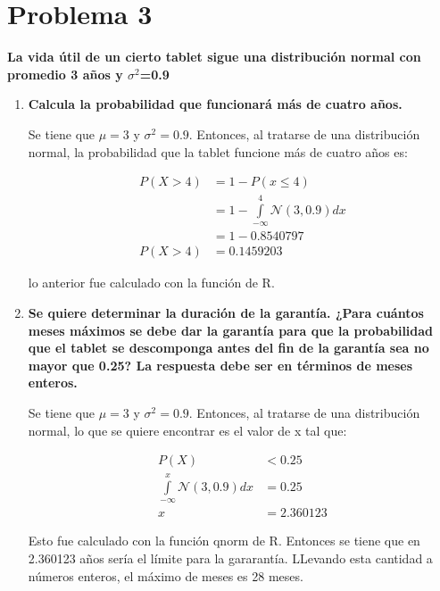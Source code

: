 \section*{Problema 3}
\textbf{La vida útil de un cierto tablet sigue una distribución normal con promedio 3 años y $\sigma^2$=0.9}

\begin{enumerate}
    \item \textbf{Calcula la probabilidad que funcionará más de cuatro años.}

          Se tiene que $\mu=3$ y $\sigma^2=0.9$. Entonces, al tratarse de una distribución normal, la probabilidad que la tablet funcione más de cuatro años es:

          \begin{align*}
              P(X>4) & = 1 - P(x\leq 4)                                    \\
                     & = 1 - \int\limits_{-\infty}^4 \mathcal{N} (3,0.9)dx \\
                     & = 1 - 0.8540797                                     \\
              P(X>4) & = 0.1459203
          \end{align*}

          lo anterior fue calculado con la función  de R.

    \item \textbf{Se quiere determinar la duración de la garantía. ¿Para cuántos meses máximos se debe dar la garantía para que la probabilidad que el tablet se descomponga antes del fin de la garantía sea no mayor que 0.25? La respuesta debe ser en términos de meses enteros.}

          Se tiene que $\mu=3$ y $\sigma^2=0.9$. Entonces, al tratarse de una distribución normal, lo que se quiere encontrar es el valor de x tal que:

          \begin{align*}
              P(X)                                          & <0.25      \\
              \int\limits_{-\infty}^x \mathcal{N} (3,0.9)dx & = 0.25     \\
              x                                             & = 2.360123
          \end{align*}

          Esto fue calculado con la función qnorm de R. Entonces se tiene que en 2.360123 años sería el límite para la gararantía. LLevando esta cantidad a números enteros, el máximo de meses es 28 meses.
\end{enumerate}